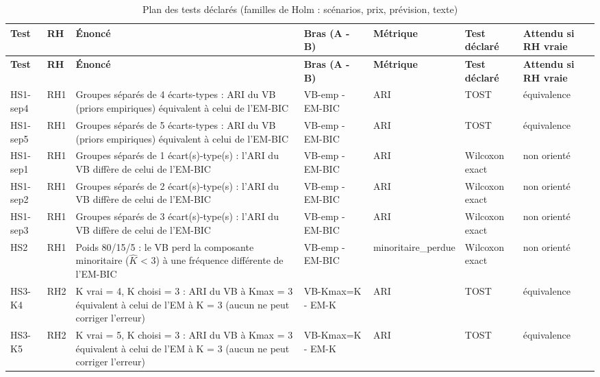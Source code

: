 {\tiny
\setlength{\tabcolsep}{3pt}
\begin{longtable}{>{\raggedright\arraybackslash}p{1.70cm}>{\raggedright\arraybackslash}p{0.80cm}>{\raggedright\arraybackslash}p{6.20cm}>{\raggedright\arraybackslash}p{2.20cm}>{\raggedright\arraybackslash}p{1.60cm}>{\raggedright\arraybackslash}p{1.50cm}>{\raggedright\arraybackslash}p{1.60cm}}
\caption{Plan des tests déclarés (familles de Holm : scénarios, prix, prévision, texte)}\label{tab:plan_tests}\\
\toprule
\textbf{Test} & \textbf{RH} & \textbf{Énoncé} & \textbf{Bras (A - B)} & \textbf{Métrique} & \textbf{Test déclaré} & \textbf{Attendu si RH vraie} \\
\midrule
\endfirsthead
\toprule
\textbf{Test} & \textbf{RH} & \textbf{Énoncé} & \textbf{Bras (A - B)} & \textbf{Métrique} & \textbf{Test déclaré} & \textbf{Attendu si RH vraie} \\
\midrule
\endhead
\bottomrule
\endfoot
HS1-sep4 & RH1 & Groupes séparés de 4 écarts-types : ARI du VB (priors empiriques) équivalent à celui de l'EM-BIC & VB-emp - EM-BIC & ARI & TOST & équivalence \\
HS1-sep5 & RH1 & Groupes séparés de 5 écarts-types : ARI du VB (priors empiriques) équivalent à celui de l'EM-BIC & VB-emp - EM-BIC & ARI & TOST & équivalence \\
HS1-sep1 & RH1 & Groupes séparés de 1 écart(s)-type(s) : l'ARI du VB diffère de celui de l'EM-BIC & VB-emp - EM-BIC & ARI & Wilcoxon exact & non orienté \\
HS1-sep2 & RH1 & Groupes séparés de 2 écart(s)-type(s) : l'ARI du VB diffère de celui de l'EM-BIC & VB-emp - EM-BIC & ARI & Wilcoxon exact & non orienté \\
HS1-sep3 & RH1 & Groupes séparés de 3 écart(s)-type(s) : l'ARI du VB diffère de celui de l'EM-BIC & VB-emp - EM-BIC & ARI & Wilcoxon exact & non orienté \\
HS2 & RH1 & Poids 80/15/5 : le VB perd la composante minoritaire ($\hat K$ < 3) à une fréquence différente de l'EM-BIC & VB-emp - EM-BIC & minoritaire\_perdue & Wilcoxon exact & non orienté \\
HS3-K4 & RH2 & K vrai = 4, K choisi = 3 : ARI du VB à Kmax = 3 équivalent à celui de l'EM à K = 3 (aucun ne peut corriger l'erreur) & VB-Kmax=K - EM-K & ARI & TOST & équivalence \\
HS3-K5 & RH2 & K vrai = 5, K choisi = 3 : ARI du VB à Kmax = 3 équivalent à celui de l'EM à K = 3 (aucun ne peut corriger l'erreur) & VB-Kmax=K - EM-K & ARI & TOST & équivalence \\

\end{longtable}}
